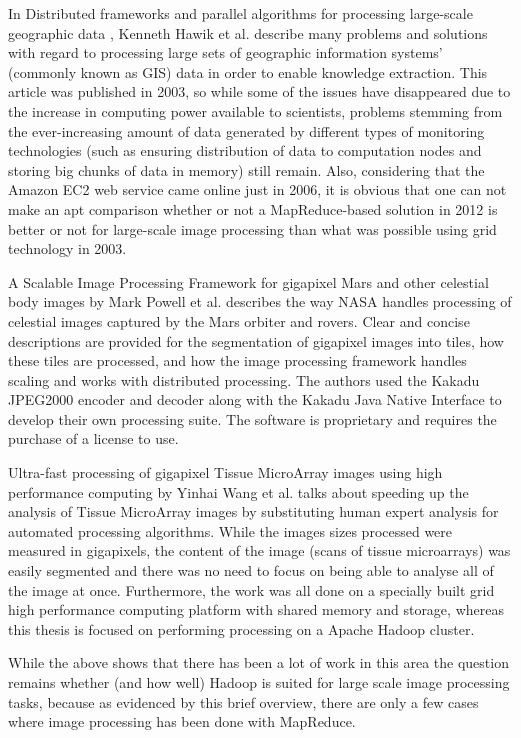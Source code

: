 \documentclass [12pt,a4paper]{report}
\begin{document}
In Distributed frameworks and parallel algorithms for processing large-scale geographic data \cite{Hawick:2003:DFP:958021.958024}, Kenneth Hawik et al. describe many problems and solutions with regard to processing large sets of geographic information systems' (commonly known as GIS) data in order to enable knowledge extraction. This article was published in 2003, so while some of the issues have disappeared due to the increase in computing power available to scientists, problems stemming from the ever-increasing amount of data generated by different types of monitoring technologies (such as ensuring distribution of data to computation nodes and storing big chunks of data in memory) still remain. Also, considering that the Amazon EC2 \cite{website:amazon_ec2} web service came online just in 2006, it is obvious that one can not make an apt comparison whether or not a MapReduce-based solution in 2012 is better or not for large-scale image processing than what was possible using grid technology in 2003.

A Scalable Image Processing Framework for gigapixel Mars and other celestial body  images \cite{5446706} by Mark Powell et al. describes the way NASA handles processing of celestial images captured by the Mars orbiter and rovers. Clear and concise descriptions are provided for the segmentation of gigapixel images into tiles, how these tiles are processed, and how the image processing framework handles scaling and works with distributed processing. The authors used the Kakadu JPEG2000 encoder and decoder along with the Kakadu Java Native Interface to develop their own processing suite. The software is proprietary and requires the purchase of a license to use.

Ultra-fast processing of gigapixel Tissue MicroArray images using high performance computing \cite{wang2011ult} by Yinhai Wang et al. talks about speeding up the analysis of Tissue MicroArray images by substituting human expert analysis for automated processing algorithms. While the images sizes processed were measured in gigapixels, the content of the image (scans of tissue microarrays) was easily segmented and there was no need to focus on being able to analyse all of the image at once. Furthermore, the work was all done on a specially built grid high performance computing platform with shared memory and storage, whereas this thesis is focused on performing processing on a Apache Hadoop cluster.

While the above shows that there has been a lot of work in this area the question remains whether (and how well) Hadoop is suited for large scale image processing tasks, because as evidenced by this brief overview, there are only a few cases where image processing has been done with MapReduce. 
\end{document}
